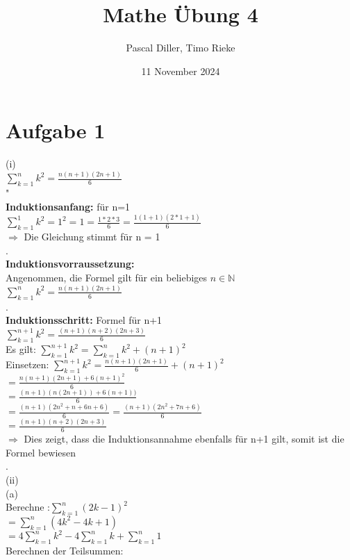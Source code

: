 \documentclass{article}
\title{Mathe Übung 4}
\author{Pascal Diller, Timo Rieke}
\date{11 November 2024}
\begin{document}
\maketitle
\section{Aufgabe 1}
\begin{center}
  (i) \\
$\sum_{k = 1}^{n}k^2 = \frac{n(n+1)(2n+1)}{6}$ \\ 
"\\
\textbf{Induktionsanfang:} für n=1 \\
$\sum_{k = 1}^{1}k^2 = 1^2 = 1 = \frac{1*2*3}{6} =\frac{1(1+1)(2*1+1)}{6}$\\
$\Longrightarrow{}$ Die Gleichung stimmt für n = 1 \\
.\\
\textbf{Induktionsvorraussetzung:} \\
Angenommen, die Formel gilt für ein beliebiges $n \in \mathbb{N}$ \\
$\sum_{k = 1}^{n}k^2 = \frac{n(n+1)(2n+1)}{6}$ \\ 
.\\
\textbf{Induktionsschritt:} Formel für n+1 \\
$\sum_{k = 1}^{n+1}k^2 = \frac{(n+1)(n+2)(2n+3)}{6}$ \\ 
Es gilt: 
$\sum_{k = 1}^{n+1} k^2 = \sum_{k = 1}^{n}k^2 + (n+1)^2$ \\
Einsetzen: 
$\sum_{k = 1}^{n+1}k^2 = \frac{n(n+1)(2n+1)}{6} + (n+1)^2$  \\ 
$ = \frac{n(n+1)(2n+1)+6(n+1)^2}{6}$  \\ 
$ = \frac{(n+1)(n(2n+1))+6(n+1))}{6}$  \\ 
$ = \frac{(n+1)(2n^2+n+6n+6)}{6} = \frac{(n+1)(2n^2+7n+6)}{6}$  \\ 
$ = \frac{(n+1)(n+2)(2n+3)}{6}$  \\ 
$\Longrightarrow{}$ Dies zeigt, dass die Induktionsannahme ebenfalls für n+1 gilt, somit ist die Formel bewiesen \\
. \\
(ii) \\ 
(a) \\
Berechne :$\sum_{k=1}^{n}(2k-1)^2$ \\
$= \sum_{k=1}^{n}(4k^2 - 4k +1)$ \\
$= 4\sum_{k=1}^{n}k^2 - 4\sum_{k=1}^{n}k + \sum_{k=1}^{n}1$\\
Berechnen der Teilsummen:\\

\end{center}
\end{document}
